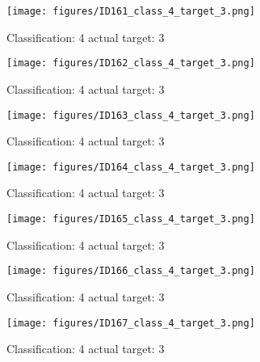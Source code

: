 \begin{figure}[h!]
\begin{center}
\texttt{[image: figures/ID161\_class\_4\_target\_3.png]}
\end{center}
\caption{ Classification: 4 actual target: 3}
\label{fig:ID161_class_4_target_3}
\end{figure}
\begin{figure}[h!]
\begin{center}
\texttt{[image: figures/ID162\_class\_4\_target\_3.png]}
\end{center}
\caption{ Classification: 4 actual target: 3}
\label{fig:ID162_class_4_target_3}
\end{figure}
\begin{figure}[h!]
\begin{center}
\texttt{[image: figures/ID163\_class\_4\_target\_3.png]}
\end{center}
\caption{ Classification: 4 actual target: 3}
\label{fig:ID163_class_4_target_3}
\end{figure}
\begin{figure}[h!]
\begin{center}
\texttt{[image: figures/ID164\_class\_4\_target\_3.png]}
\end{center}
\caption{ Classification: 4 actual target: 3}
\label{fig:ID164_class_4_target_3}
\end{figure}
\begin{figure}[h!]
\begin{center}
\texttt{[image: figures/ID165\_class\_4\_target\_3.png]}
\end{center}
\caption{ Classification: 4 actual target: 3}
\label{fig:ID165_class_4_target_3}
\end{figure}
\begin{figure}[h!]
\begin{center}
\texttt{[image: figures/ID166\_class\_4\_target\_3.png]}
\end{center}
\caption{ Classification: 4 actual target: 3}
\label{fig:ID166_class_4_target_3}
\end{figure}
\begin{figure}[h!]
\begin{center}
\texttt{[image: figures/ID167\_class\_4\_target\_3.png]}
\end{center}
\caption{ Classification: 4 actual target: 3}
\label{fig:ID167_class_4_target_3}
\end{figure}
